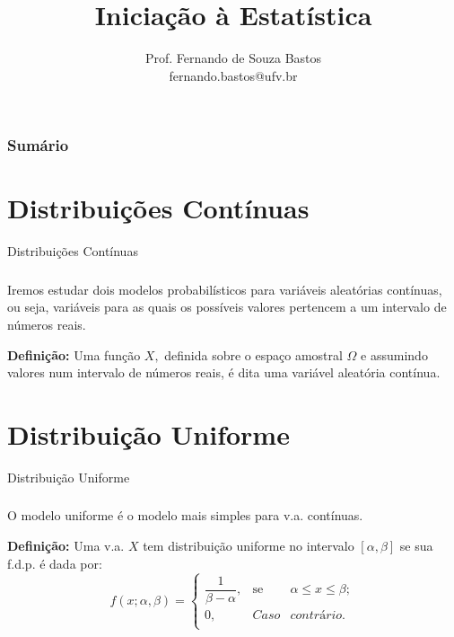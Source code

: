 \documentclass[14pt,aspectratio=1610]{beamer}
\title{Iniciação à Estatística}
\author{Prof. Fernando de Souza Bastos \texorpdfstring{\\ fernando.bastos@ufv.br}{}}
\institute{Departamento de Estatística \texorpdfstring{\\ Universidade Federal de Viçosa}{}\texorpdfstring{\\ Campus UFV - Viçosa}{}}
\date{}
\begin{document}
%


\frame{\titlepage}

\begin{frame}{}
\frametitle{\bf Sumário}
\tableofcontents
\end{frame}

\section{Distribuições Contínuas}
\begin{frame}{Distribuições Contínuas}
\frametitle{}
\begin{block}{}
\justifying
Iremos estudar dois modelos probabilísticos para variáveis aleatórias contínuas,
ou seja, variáveis para as quais os possíveis valores pertencem a um intervalo
de números reais.
\end{block}
\pause
\begin{block}{}
\justifying
{\bf Definição:} Uma função $X,$ definida sobre o espaço amostral $\Omega$ e assumindo valores num intervalo de números reais, é dita uma variável aleatória contínua.
\end{block}
\end{frame}

\section{Distribuição Uniforme}
\begin{frame}{Distribuição Uniforme}
\frametitle{}
\begin{block}{}
\justifying
O modelo uniforme é o modelo mais simples para v.a. contínuas.
\end{block}
\pause
\begin{block}{}
\justifying
{\bf Definição:} Uma v.a. $X$ tem distribuição uniforme no intervalo $[\alpha,\beta]$ se sua f.d.p. é dada por:
$$
f(x;\alpha,\beta)=\left\{
\begin{array}{ccccc}
\dfrac{1}{\beta-\alpha}, & \textrm{se} & \alpha\leq x \leq \beta     ;\\
                      0, & Caso        & contrário .\\
\end{array}
\right.
$$
\end{block}
\end{frame}
\end{document}
